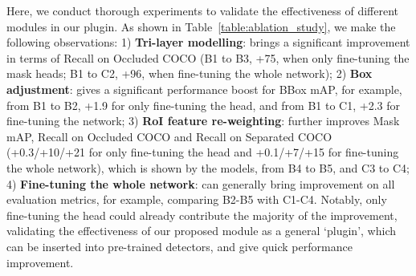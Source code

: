 \documentclass{bmvc2k}
\begin{document}
Here, we conduct thorough experiments to validate the effectiveness of different modules in our plugin. As shown in Table~\ref{table:ablation_study}, we make the following observations: 
1) \textbf{Tri-layer modelling}:
brings a significant improvement in terms of Recall on Occluded COCO (B1 to B3, +75, when only fine-tuning the mask heads; B1 to C2, +96, when fine-tuning the whole network);
2) \textbf{Box adjustment}: gives a significant performance boost for BBox mAP, for example, from B1 to B2,  +1.9 for only fine-tuning the head, and from B1 to C1, +2.3 for fine-tuning the network;
3) \textbf{RoI feature re-weighting}: further improves  Mask mAP, Recall on Occluded COCO and Recall on Separated COCO (+0.3/+10/+21 for only fine-tuning the head and +0.1/+7/+15 for fine-tuning the whole network), which is shown by the models, from B4 to B5, and C3 to C4;
4) \textbf{Fine-tuning the whole network}: 
can generally bring improvement on all evaluation metrics,
for example, comparing B2-B5 with C1-C4. Notably, only fine-tuning the head could already contribute the majority of the improvement, validating the effectiveness of our proposed module as a general `plugin', which can be inserted into pre-trained detectors, and give quick performance improvement.
\end{document}
